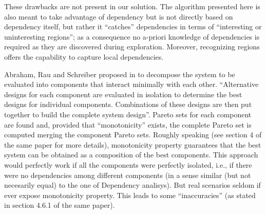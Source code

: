 These drawbacks are not present in our solution. The algorithm presented
here is also meant to take advantage of dependency but is not directly
based on dependency itself, but rather it ``catches'' dependencies
in terms of ``interesting or uninteresting regions''; as a consequence
no a-priori knowledge of dependencies is required as they are discovered
during exploration. Moreover, recognizing regions offers the capability
to capture local dependencies.

Abraham, Rau and Schreiber proposed in \cite{santosh_hptr00} to decompose
the system to be evaluated into components that interact minimally
with each other. ``Alternative designs for each component are evaluated
in isolation to determine the best designs for individual components.
Combinations of these designs are then put together to build the complete
system design''. Pareto sets for each component are found and, provided
that ``monotonicity'' exists, the complete Pareto set is computed
merging the component Pareto sets. Roughly speaking (see section 4
of the same paper for more details), monotonicity property guarantees
that the best system can be obtained as a composition of the best
components. This approach would perfectly work if all the components
were perfectly isolated, i.e., if there were no dependencies among
different components (in a sense similar (but not necesarily equal)
to the one of Dependency analisys). But real scenarios seldom if ever
expose monotonicity property. This leads to some ``inaccuracies''
(as stated in section 4.6.1 of the same paper).


